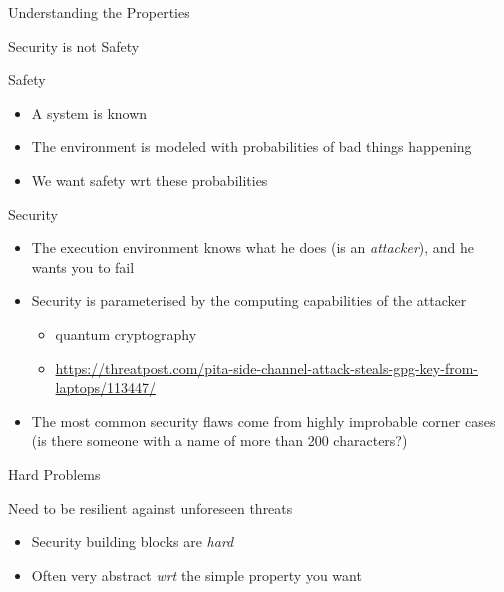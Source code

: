 \begin{reveals}
\begin{frame}[c]{Understanding the Properties}
\end{frame}

\begin{frame}[c]{Security is not Safety}
  
  \begin{block}{Safety}
    \begin{itemize}
    \item A system is known
    \item The environment is modeled with probabilities of bad things happening
    \item We want safety wrt these probabilities
    \end{itemize}
  \end{block}

  \vfill

  \begin{block}{Security}
    \begin{itemize}
    \item The execution environment knows what he does (is an
      \emph{attacker}), and he wants you to fail
    \item Security is parameterised by the computing capabilities of
      the attacker
      \begin{itemize}
      \item quantum cryptography
      \item \url{https://threatpost.com/pita-side-channel-attack-steals-gpg-key-from-laptops/113447/}
      \end{itemize}
    \item The most common security flaws come from highly improbable
      corner cases (is there someone with a name of more than 200 characters?)
    \end{itemize}
  \end{block}

\end{frame}

\begin{frame}{Hard Problems}

    \begin{block}{Need to be resilient against unforeseen threats}
    \begin{itemize}
    \item Security building blocks are \emph{hard}
    \item Often very abstract \textit{wrt} the simple property you
      want
    \end{itemize}
  \end{block}


\end{frame}
\end{reveals}
